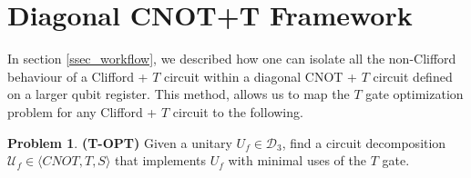 \documentclass[notitlepage]{article}
\theoremstyle{definition}
\theoremstyle{problem}
\newtheorem{problem}{Problem}[section]
\theoremstyle{lemma}
\begin{document}

\FloatBarrier
\section{Diagonal CNOT+T Framework}
\label{ssec_diag}

In section \ref{ssec_workflow}, we described how one can isolate all the non-Clifford behaviour of a Clifford + $T$ circuit within a diagonal CNOT + $T$ circuit defined on a larger qubit register. This method, allows us to map the $T$ gate optimization problem for any Clifford + $T$ circuit to the following.
\begin{problem}{\textbf{(T-OPT)}}
	\label{p_topt}
	Given a unitary $U_f \in \mathcal{D}_3$, find a circuit decomposition $\mathcal{U}_f \in \langle CNOT, T, S \rangle$ that implements $U_f$ with minimal uses of the $T$ gate.
\end{problem}
\end{document}
